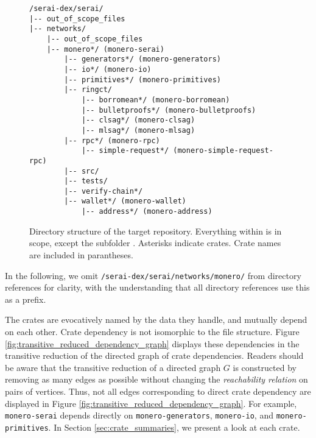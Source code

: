 \begin{figure}[ht]
\centering
\begin{minipage}{0.9\linewidth}
\begin{mdframed}
\begin{verbatim}
/serai-dex/serai/
|-- out_of_scope_files
|-- networks/
    |-- out_of_scope_files
    |-- monero*/ (monero-serai)
        |-- generators*/ (monero-generators)
        |-- io*/ (monero-io)
        |-- primitives*/ (monero-primitives)
        |-- ringct/
            |-- borromean*/ (monero-borromean)
            |-- bulletproofs*/ (monero-bulletproofs)
            |-- clsag*/ (monero-clsag)
            |-- mlsag*/ (monero-mlsag)
        |-- rpc*/ (monero-rpc)
            |-- simple-request*/ (monero-simple-request-rpc)
        |-- src/
        |-- tests/
        |-- verify-chain*/
        |-- wallet*/ (monero-wallet)
            |-- address*/ (monero-address)
\end{verbatim}
\end{mdframed}
\end{minipage}
\caption{Directory structure of the target repository. Everything within \protect{} is in scope, except the subfolder \protect{}. Asterisks indicate crates. Crate names are included in parantheses.}
\label{fig:directory_structure}
\end{figure}


In the following, we omit \texttt{/serai-dex/serai/networks/monero/} from directory references for clarity, with the understanding that all directory references use this as a prefix.

The crates are evocatively named by the data they handle, and mutually depend on each other. Crate dependency is not isomorphic to the file structure. 
Figure \ref{fig:transitive_reduced_dependency_graph} displays these dependencies in the transitive reduction of the directed graph of crate dependencies. Readers should be aware that the transitive reduction of a directed graph $G$ is constructed by removing as many edges as possible without changing the \textit{reachability relation} on pairs of vertices. Thus, not all edges corresponding to direct crate dependency are displayed in Figure \ref{fig:transitive_reduced_dependency_graph}. For example, \texttt{monero-serai} depends directly on \texttt{monero-generators}, \texttt{monero-io}, and \texttt{monero-primitives}.
In Section \ref{sec:crate_summaries}, we present a look at each crate. 

